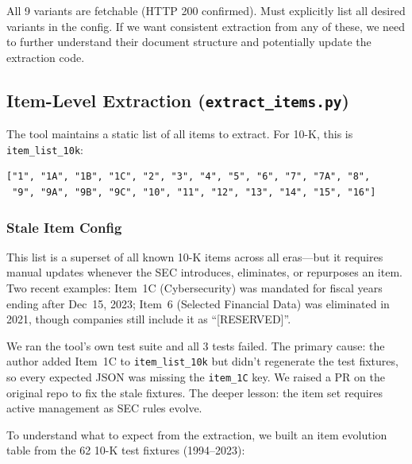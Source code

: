 \documentclass[11pt]{article}
\begin{document}
All 9 variants are fetchable (HTTP 200 confirmed). Must explicitly list all
desired variants in the config. If we want consistent extraction from any of
these, we need to further understand their document structure and potentially
update the extraction code.

\subsection{Item-Level Extraction (\texttt{extract\_items.py})}

The tool maintains a static list of all items to extract. For 10-K, this is
\texttt{item\_list\_10k}:

\begin{lstlisting}[language={}]
["1", "1A", "1B", "1C", "2", "3", "4", "5", "6", "7", "7A", "8",
 "9", "9A", "9B", "9C", "10", "11", "12", "13", "14", "15", "16"]
\end{lstlisting}

\subsubsection{Stale Item Config}

This list is a superset of all known 10-K items across all eras---but it
requires manual updates whenever the SEC introduces, eliminates, or repurposes
an item. Two recent examples: Item~1C (Cybersecurity) was mandated for fiscal
years ending after Dec~15, 2023; Item~6 (Selected Financial Data) was eliminated
in 2021, though companies still include it as ``[RESERVED]''.

We ran the tool's own test suite and all 3 tests failed. The primary cause: the
author added Item~1C to \texttt{item\_list\_10k} but didn't regenerate the test
fixtures, so every expected JSON was missing the \texttt{item\_1C} key. We
raised a PR on the original repo to fix the stale fixtures. The deeper lesson:
the item set requires active management as SEC rules evolve.

To understand what to expect from the extraction, we built an item evolution
table from the 62 10-K test fixtures (1994--2023):
\end{document}
